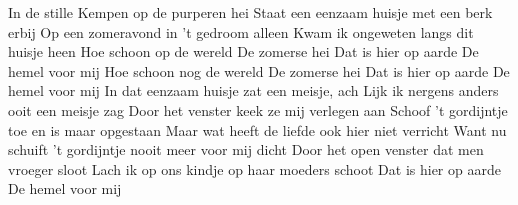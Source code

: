 \beginverse
In de stille Kempen op de purperen hei
Staat een eenzaam huisje met een berk erbij
Op een zomeravond in 't gedroom alleen
Kwam ik ongeweten langs dit huisje heen
\endverse
\beginchorus
Hoe schoon op de wereld
De zomerse hei
Dat is hier op aarde
De hemel voor mij
Hoe schoon nog de wereld
De zomerse hei
Dat is hier op aarde
De hemel voor mij
\endchorus
\beginverse
In dat eenzaam huisje zat een meisje, ach
Lijk ik nergens anders ooit een meisje zag
Door het venster keek ze mij verlegen aan
Schoof 't gordijntje toe en is maar opgestaan
\endverse
\beginverse
Maar wat heeft de liefde ook hier niet verricht
Want nu schuift 't gordijntje nooit meer voor mij dicht
Door het open venster dat men vroeger sloot
Lach ik op ons kindje op haar moeders schoot
\endverse
\beginverse
Dat is hier op aarde
De hemel voor mij
\endverse
\endsong